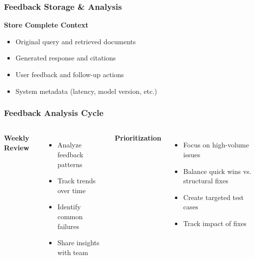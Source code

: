 \begin{frame}
    \frametitle{Feedback Storage \& Analysis}
    
    \textbf{Store Complete Context}
    \begin{itemize}
        \item Original query and retrieved documents
        \item Generated response and citations
        \item User feedback and follow-up actions
        \item System metadata (latency, model version, etc.)
    \end{itemize}
    
    \vspace{0.3cm}
    \begin{center}
    \end{center}
\end{frame}

\begin{frame}
    \frametitle{Feedback Analysis Cycle}
    
    \begin{columns}
        \textbf{Weekly Review}
        \begin{itemize}
            \item Analyze feedback patterns
            \item Track trends over time
            \item Identify common failures
            \item Share insights with team
        \end{itemize}
        
        \textbf{Prioritization}
        \begin{itemize}
            \item Focus on high-volume issues
            \item Balance quick wins vs. structural fixes
            \item Create targeted test cases
            \item Track impact of fixes
        \end{itemize}
    \end{columns}
\end{frame}

